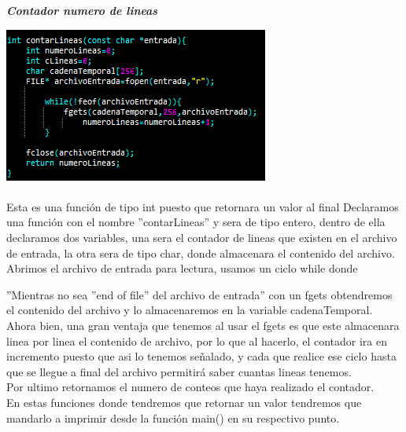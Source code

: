 \documentclass[12pt,letterpaper]{report}
\begin{document}
\textbf{\textit{\em{Contador numero de lineas}}}
\begin{multicols}{2}

\includegraphics[scale=0.7]{punto8-1}\\
\\Esta es una función de tipo int puesto que retornara un valor al final Declaramos una función con el nombre ''contarLineas'' y sera de tipo entero, dentro de ella declaramos dos variables, una sera el contador de lineas que existen en el archivo de entrada, la otra sera de tipo char, donde almacenara el contenido del archivo. Abrimos el archivo de entrada para lectura, usamos un ciclo while donde 
\end{multicols}
''Mientras no sea ''end of file'' del archivo de entrada'' con un fgets obtendremos el contenido del archivo y lo almacenaremos en la variable cadenaTemporal. Ahora bien, una gran ventaja que tenemos al usar el fgets es que este almacenara linea por linea el contenido de archivo, por lo que al hacerlo, el contador ira en incremento puesto que asi lo tenemos señalado, y cada que realice ese ciclo hasta que se llegue a final del archivo permitirá saber cuantas lineas tenemos.\\
Por ultimo retornamos el numero de conteos que haya realizado el contador.\\
En estas funciones donde tendremos que retornar un valor tendremos que mandarlo a imprimir desde la función main() en su respectivo punto.\\
\end{document}
